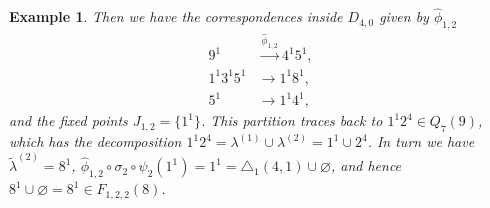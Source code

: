 \documentclass[12pt,reqno]{amsart}
\numberwithin{equation}{section}
\newtheorem{Example}{Example}[section]
\begin{document}
\begin{Example}
	Then we have the correspondences inside $D_{4,0}$
	given by $\hat{\phi}_{1,2}$
	\begin{align*}
		9^{1} &\overset{\hat{\phi}_{1,2}}{\longrightarrow} 4^{1}5^{1},\\
		1^{1}3^{1}5^{1} &\longrightarrow 1^{1}8^{1},\\
		5^{1} &\longrightarrow 1^{1}4^{1},
	\end{align*}
	and the fixed points $J_{1,2}=\{1^{1}\}$. This partition traces back to $1^1 2^4\in Q_7(9)$, which has the decomposition $1^1 2^4 = \lambda^{(1)}\cup\lambda^{(2)}= 1^1 \cup 2^4$. In turn we have $\tilde{\lambda}^{(2)}=8^1$, $\hat{\phi}_{1,2}\circ\sigma_2\circ\psi_2(1^1)=1^1=\triangle_1(4,1)\cup\varnothing$, and hence $8^1\cup\varnothing=8^1\in F_{1,2,2}(8)$.
	
	
	
	
	
\end{Example}
\end{document}
